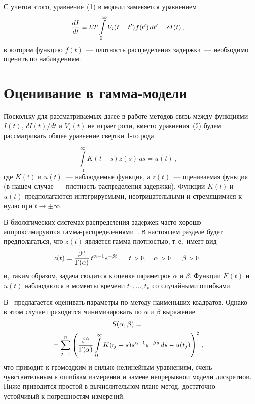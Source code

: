 \begin{multicols}{2}
С учетом этого, уравнение~(1) в модели заменяется уравнением
\begin{equation}
\displaystyle\frac{\displaystyle dI\mathstrut}{\displaystyle dt\mathstrut}=kT\int\limits_0^\infty V_I(t-t')f(t')\,dt'-\delta I(t)\,,
\label{2us}
\end{equation}
в котором функцию $f(t)$~--- плотность распределения задержки~---
необходимо оценить по наблюдениям.

\section{Оценивание в гамма-модели}

Поскольку для рассматриваемых далее в работе методов связь между
функциями $I(t)$, $dI(t)/dt$ и $V_I(t)$ не играет роли, вместо
уравнения~(2) будем рассматривать общее уравнение свертки 1-го
рода 


\noindent
\begin{equation}
\int\limits_0^\infty K(t-s)z(s)\,ds=u(t)\,,
\label{3us}
\end{equation} 
где $K(t)$ и
$u(t)$~--- наблюдаемые функции, а $z(t)$~--- оцениваемая функция
(в нашем случае~--- плотность распределения задержки). Функции
$K(t)$ и $u(t)$ предполагаются интегрируемыми, неотрицательными и
стремящимися к нулю при $t \to \pm \infty$.

В биологических системах распределения задержек часто хорошо
аппроксимируются гамма-рас\-пре\-де\-ле\-ниями~\cite{6us}. В настоящем разделе
будет предполагаться, что $z(t)$ является гамма-плот\-ностью, т.\,е.\
имеет вид
$$
z(t)=\displaystyle\frac{\displaystyle \beta^\alpha\mathstrut}{\displaystyle \Gamma(\alpha)\mathstrut}\,t^{\alpha-1}e^{-\beta t}\,,\quad 
t>0,\quad \alpha>0\,,\quad \beta>0\,,
$$ 
и, таким образом, задача
сводится к оценке параметров $\alpha$ и $\beta$. Функции $K(t)$ и
$u(t)$ наблюдаются в  моменты времени $t_1,\ldots ,t_n$ со случайными
ошибками.

В~\cite{4us} предлагается оценивать параметры по методу наименьших квадратов.
Однако в этом случае приходится минимизировать по $\alpha$ и $\beta$ выражение
\begin{multline*}
S(\alpha,\beta)={}\\
{}=\sum_{j=1}^n
\left(
\displaystyle\frac{\displaystyle \beta^\alpha\mathstrut}{\displaystyle \Gamma(\alpha)\mathstrut}
\int\limits_0^\infty K(t_j-s)s^{\alpha-1}e^{-\beta s}\,ds-u(t_j)
\right)^2\,,
\end{multline*}
что приводит к громоздким и сильно нелинейным уравнениям, очень чувствительным к
ошибкам измерений и замене непрерывной модели дискретной. Ниже приводится простой
в вычислительном плане метод, достаточно устойчивый к погрешностям измерений.
\begin{table*}\small
\begin{center}
\vspace*{2ex}


\end{center}
\end{table*}
\end{multicols}
